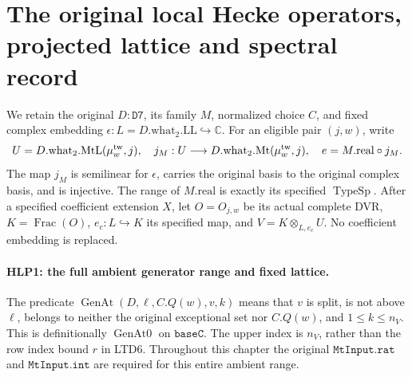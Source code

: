 \section{The original local Hecke operators, projected lattice and spectral record}
\label{sec:local-hecke-projection}


We retain the original \(D:\texttt{D7}\), its family \(M\), normalized
choice \(C\), and fixed complex embedding
\(\epsilon:L=D.\mathrm{what}_2.\mathrm{LL}\hookrightarrow\mathbb C\).
For an eligible pair \((j,w)\), write
\[
 U=D.\mathrm{what}_2.\mathrm{MtL}(\mu^{\rm tw}_w,j),\quad
 j_M:U\longrightarrow D.\mathrm{what}_2.\mathrm{Mt}(\mu^{\rm tw}_w,j),
 \quad e=M.\mathrm{real}\circ j_M.
\]
The map \(j_M\) is semilinear for \(\epsilon\), carries the original
basis to the original complex basis, and is injective. The range of
\(M.\mathrm{real}\) is exactly its specified \(\operatorname{TypeSp}\).
After a specified coefficient extension \(X\), let \(O=O_{j,w}\) be its
actual complete DVR, \(K=\operatorname{Frac}(O)\),
\(e_c:L\hookrightarrow K\) its specified map, and
\(V=K\otimes_{L,e_c}U\). No coefficient embedding is replaced.

\paragraph{HLP1: the full ambient generator range and fixed lattice.}
\label{claim:HLP1}
The predicate \(\operatorname{GenAt}(D,\ell,C.Q(w),v,k)\) means that
\(v\) is split, is not above \(\ell\), belongs to neither the original
exceptional set nor \(C.Q(w)\), and \(1\le k\le n_V\).
This is definitionally \(\operatorname{GenAt0}\) on \(\texttt{baseC}\).
The upper index is \(n_V\), rather than the row index bound \(r\) in
LTD6. Throughout this chapter the original \(\texttt{MtInput.rat}\) and
\(\texttt{MtInput.int}\) are required for this entire ambient range.

